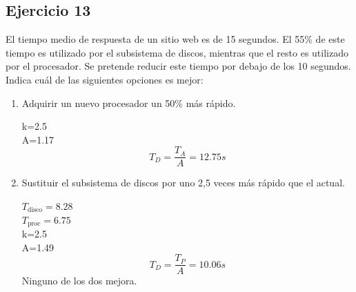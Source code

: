 \subsection{Ejercicio 13}
\noindent
El tiempo medio de respuesta de un sitio web es de 15 segundos. El 55\% de este tiempo es utilizado por el subsistema de discos, mientras que el resto es utilizado por el procesador. Se pretende reducir este tiempo por debajo de los 10 segundos. Indica cuál de las siguientes opciones es mejor:
\begin{enumerate}
    \item Adquirir un nuevo procesador un 50\% más rápido.
\begin{tcolorbox}[colback=white,colframe=cyan!50!black,fonttitle=\bfseries]
k=2.5\\
A=1.17
\[
T_D=\dfrac{T_A}{A}=12.75s
\]
\end{tcolorbox}    
    \item Sustituir el subsistema de discos por uno 2,5 veces más rápido que el actual.
\begin{tcolorbox}[colback=white,colframe=cyan!50!black,fonttitle=\bfseries]
$T_{\text{disco}}=8.28$\\
$T_{\text{proc}}=6.75$\\
k=2.5\\
A=1.49
\[
T_D=\dfrac{T_P}{A}=10.06s
\]
Ninguno de los dos mejora.
\end{tcolorbox}    
\end{enumerate}
